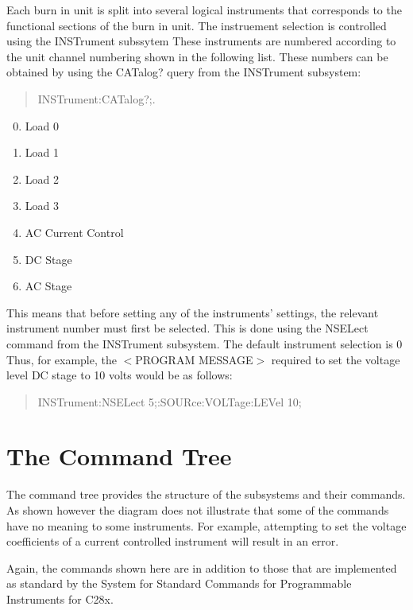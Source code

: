 Each burn in unit is split into several logical instruments that corresponds to the functional sections of the burn in unit. The instruement selection is controlled using the {\ttfamily I\-N\-S\-Trument} subssytem These instruments are numbered according to the unit channel numbering shown in the following list. These numbers can be obtained by using the {\ttfamily C\-A\-Talog}? query from the {\ttfamily I\-N\-S\-Trument} subsystem\-: \begin{quotation}
{\ttfamily I\-N\-S\-Trument\-:C\-A\-Talog?;}.

\end{quotation}


\begin{enumerate}\setcounter{enumi}{-1} \item Load 0 \item Load 1 \item Load 2 \item Load 3 \item AC Current Control \item DC Stage \item AC Stage \end{enumerate}

This means that before setting any of the instruments' settings, the relevant instrument number must first be selected. This is done using the {\ttfamily N\-S\-E\-Lect} command from the {\ttfamily I\-N\-S\-Trument} subsystem. The default instrument selection is 0 Thus, for example, the {\ttfamily $<$}P\-R\-O\-G\-R\-A\-M M\-E\-S\-S\-A\-G\-E{\ttfamily $>$} required to set the voltage level D\-C stage to 10 volts would be as follows\-: \begin{quotation}
{\ttfamily I\-N\-S\-Trument\-:N\-S\-E\-Lect 5;\-:S\-O\-U\-Rce\-:\-V\-O\-L\-Tage\-:L\-E\-Vel 10;}

\end{quotation}
\hypertarget{a00002_tree}{}\section{The Command Tree}\label{a00002_tree}
The command tree provides the structure of the subsystems and their commands. As shown however the diagram does not illustrate that some of the commands have no meaning to some instruments. For example, attempting to set the voltage coefficients of a current controlled instrument will result in an error.

Again, the commands shown here are in addition to those that are implemented as standard by the System for Standard Commands for Programmable Instruments for C28x.

